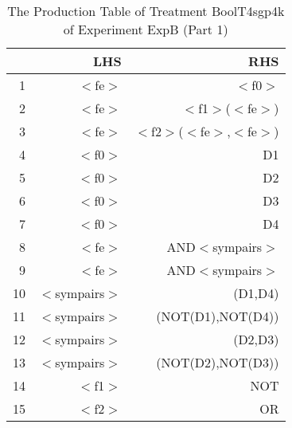 \begin{table}[ht]
\centering
\begin{tabular}{rrr}
  \hline
 & LHS & RHS \\ 
  \hline
1 & $<$fe$>$ & $<$f0$>$ \\ 
  2 & $<$fe$>$ & $<$f1$>$($<$fe$>$) \\ 
  3 & $<$fe$>$ & $<$f2$>$($<$fe$>$,$<$fe$>$) \\ 
  4 & $<$f0$>$ & D1 \\ 
  5 & $<$f0$>$ & D2 \\ 
  6 & $<$f0$>$ & D3 \\ 
  7 & $<$f0$>$ & D4 \\ 
  8 & $<$fe$>$ & AND$<$sympairs$>$ \\ 
  9 & $<$fe$>$ & AND$<$sympairs$>$ \\ 
  10 & $<$sympairs$>$ & (D1,D4) \\ 
  11 & $<$sympairs$>$ & (NOT(D1),NOT(D4)) \\ 
  12 & $<$sympairs$>$ & (D2,D3) \\ 
  13 & $<$sympairs$>$ & (NOT(D2),NOT(D3)) \\ 
  14 & $<$f1$>$ & NOT \\ 
  15 & $<$f2$>$ & OR \\ 
   \hline
\end{tabular}
\caption{The Production Table of Treatment BoolT4sgp4k of Experiment ExpB (Part 1)} 
\end{table}
